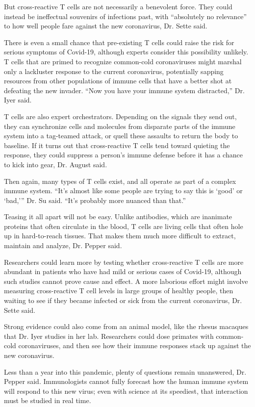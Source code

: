 But cross-reactive T cells are not necessarily a benevolent force. They
could instead be ineffectual souvenirs of infections past, with
``absolutely no relevance'' to how well people fare against the new
coronavirus, Dr. Sette said.

There is even a small chance that pre-existing T cells could raise the
risk for serious symptoms of Covid-19, although experts consider this
possibility unlikely. T cells that are primed to recognize common-cold
coronaviruses might marshal only a lackluster response to the current
coronavirus, potentially sapping resources from other populations of
immune cells that have a better shot at defeating the new invader. ``Now
you have your immune system distracted,'' Dr. Iyer said.

T cells are also expert orchestrators. Depending on the signals they
send out, they can synchronize cells and molecules from disparate parts
of the immune system into a tag-teamed attack, or quell these assaults
to return the body to baseline. If it turns out that cross-reactive T
cells tend toward quieting the response, they could suppress a person's
immune defense before it has a chance to kick into gear, Dr. August
said.

Then again, many types of T cells exist, and all operate as part of a
complex immune system. ``It's almost like some people are trying to say
this is `good' or `bad,''' Dr. Su said. ``It's probably more nuanced
than that.''

Teasing it all apart will not be easy. Unlike antibodies, which are
inanimate proteins that often circulate in the blood, T cells are living
cells that often hole up in hard-to-reach tissues. That makes them much
more difficult to extract, maintain and analyze, Dr. Pepper said.

Researchers could learn more by testing whether cross-reactive T cells
are more abundant in patients who have had mild or serious cases of
Covid-19, although such studies cannot prove cause and effect. A more
laborious effort might involve measuring cross-reactive T cell levels in
large groups of healthy people, then waiting to see if they became
infected or sick from the current coronavirus, Dr. Sette said.

Strong evidence could also come from an animal model, like the rhesus
macaques that Dr. Iyer studies in her lab. Researchers could dose
primates with common-cold coronaviruses, and then see how their immune
responses stack up against the new coronavirus.

Less than a year into this pandemic, plenty of questions remain
unanswered, Dr. Pepper said. Immunologists cannot fully forecast how the
human immune system will respond to this new virus; even with science at
its speediest, that interaction must be studied in real time.

